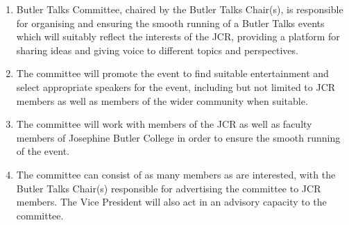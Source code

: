 
\begin{enumerate}
    \item Butler Talks Committee, chaired by the Butler Talks Chair(s), is responsible for organising and ensuring the smooth running of a Butler Talks events which will suitably reflect the interests of the JCR, providing a platform for sharing ideas and giving voice to different topics and perspectives.
    \item The committee will promote the event to find suitable entertainment and select appropriate speakers for the event, including but not limited to JCR members as well as members of the wider community when suitable.
    \item The committee will work with members of the JCR as well as faculty members of Josephine Butler College in order to ensure the smooth running of the event.
    \item The committee can consist of as many members as are interested, with the Butler Talks Chair(s) responsible for advertising the committee to JCR members. The Vice President will also act in an advisory capacity to the committee.
\end{enumerate}


